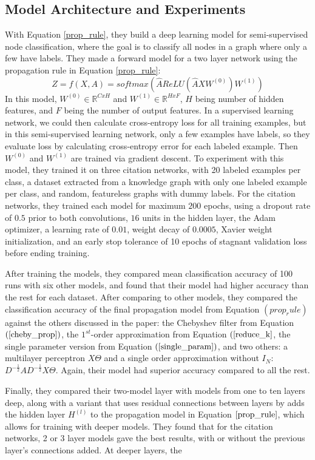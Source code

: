 \subsection{Model Architecture and Experiments}
With Equation \ref{prop_rule}, they build a deep learning model for semi-supervised node classification, where the goal is to classify all nodes in a graph where only a few have labels. They made a forward model for a two layer network using the propagation rule in Equation \ref{prop_rule}:
\begin{equation}
\label{forward_model}
Z = f(X, A) = softmax(\hat{A} ReLU(\hat{A}XW^{(0)})W^{(1)})
\end{equation}
In this model, $W^{(0)} \in \mathbb{R}^{C x H}$ and $W^{(1)} \in \mathbb{R}^{H x F}$, $H$ being number of hidden features, and $F$ being the number of output features.
In a supervised learning network, we could then calculate cross-entropy loss for all training examples, but in this semi-supervised learning network, only a few examples have labels, so they evaluate loss by calculating cross-entropy error for each labeled example. Then $W^{(0)}$ and $W^{(1)}$ are trained via gradient descent.
To experiment with this model, they trained it on three citation networks, with 20 labeled examples per class, a dataset extracted from a knowledge graph with only one labeled example per class, and random, featureless graphs with dummy labels. For the citation networks, they trained each model for maximum $200$ epochs, using a dropout rate of $0.5$ prior to both convolutions, $16$ units in the hidden layer, the Adam optimizer, a learning rate of $0.01$, weight decay of $0.0005$, Xavier weight initialization, and an early stop tolerance of 10 epochs of stagnant validation loss before ending training. 

After training the models, they compared mean classification accuracy of 100 runs with six other models, and found that their model had higher accuracy than the rest for each dataset. After comparing to other models, they compared the classification accuracy of the final propagation model from Equation $(prop_rule)$ against the others discussed in the paper: the Chebyshev filter from Equation $(\ref{cheby_prop})$, the $1^{st}$-order approximation from Equation $(\ref{reduce_k}$, the single parameter version from Equation $(\ref{single_param})$, and two others: a multilayer perceptron $X\Theta$ and a single order approximation without $I_N$: 
$D^{-\frac{1}{2}}AD^{-\frac{1}{2}}X\Theta $. Again, their model had superior accuracy compared to all the rest.

Finally, they compared their two-model layer with models from one to ten layers deep, along with a variant that uses residual connections between layers by adds the hidden layer $H^{(l)}$ to the propagation model in Equation $\ref{prop_rule}$, which allows for training with deeper models. They found that for the citation networks, 2 or 3 layer models gave the best results, with or without the previous layer's connections added. At deeper layers, the  
